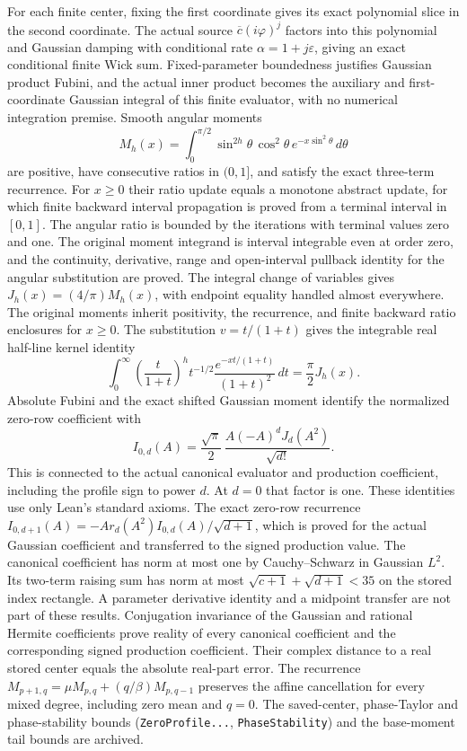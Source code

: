 \documentclass[11pt,a4paper]{article}
\newcommand{\lean}[1]{\texttt{\small #1}}
\begin{document}
For each finite center, fixing the first coordinate gives its exact polynomial
slice in the second coordinate. The actual source $\overline c(i\varphi)^j$
factors into this polynomial and Gaussian damping with conditional rate
$\alpha=1+j\varepsilon$, giving an exact conditional finite Wick sum.
Fixed-parameter boundedness justifies Gaussian product Fubini, and the actual
inner product becomes the auxiliary and first-coordinate Gaussian integral
of this finite evaluator, with no numerical integration premise.
Smooth angular moments
\[
 M_h(x)=\int_0^{\pi/2}\sin^{2h}\!\theta\,\cos^2\!\theta\,
         e^{-x\sin^2\!\theta}\,d\theta
\]
are positive, have consecutive ratios in $(0,1]$, and satisfy the exact
three-term recurrence. For $x\ge0$ their ratio update equals a monotone
abstract update, for which finite backward interval propagation is proved
from a terminal interval in $[0,1]$. The angular ratio is bounded by the
iterations with terminal values zero and one.
The original moment integrand is interval integrable even at order zero, and
the continuity, derivative, range and open-interval pullback identity for
the angular substitution are proved. The integral change of variables gives
$J_h(x)=(4/\pi)M_h(x)$, with endpoint equality handled almost everywhere.
The original moments inherit positivity, the recurrence, and finite backward
ratio enclosures for $x\ge0$. The substitution $v=t/(1+t)$ gives the
integrable real half-line kernel identity
\[
 \int_0^\infty \left(\frac{t}{1+t}\right)^h t^{-1/2}
 \frac{e^{-xt/(1+t)}}{(1+t)^2}\,dt=\frac{\pi}{2}J_h(x).
\]
Absolute Fubini and the exact shifted Gaussian moment identify the normalized
zero-row coefficient with
\[
 I_{0,d}(A)=\frac{\sqrt{\pi}}{2}\,
 \frac{A(-A)^d J_d(A^2)}{\sqrt{d!}}.
\]
This is connected to the actual canonical evaluator and production coefficient,
including the profile sign to power $d$. At $d=0$ that factor is one.
These identities use only Lean's standard axioms. The exact zero-row recurrence
$I_{0,d+1}(A)=-A r_d(A^2)I_{0,d}(A)/\sqrt{d+1}$, which is proved for the
actual Gaussian coefficient and transferred to the signed production value.
The canonical coefficient has norm at most one by Cauchy--Schwarz in Gaussian
$L^2$. Its two-term raising sum has norm at most
$\sqrt{c+1}+\sqrt{d+1}<35$ on the stored index rectangle. A parameter
derivative identity and a midpoint transfer are not part of these results.
Conjugation invariance of the Gaussian and rational Hermite coefficients prove
reality of every canonical coefficient and the corresponding signed production
coefficient. Their complex distance to a real stored center equals the absolute
real-part error.
The recurrence $M_{p+1,q}=\mu M_{p,q}+(q/\beta)M_{p,q-1}$ preserves the affine
cancellation for every mixed degree, including zero mean and $q=0$.
The saved-center, phase-Taylor and phase-stability bounds (\lean{ZeroProfile...},
\lean{PhaseStability}) and the base-moment tail bounds are archived.
\end{document}
